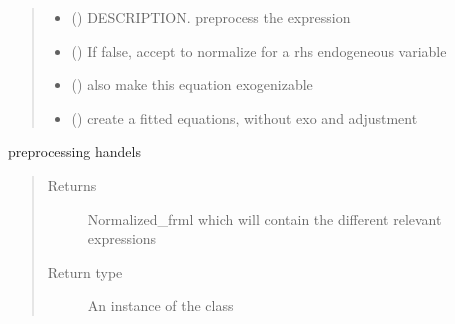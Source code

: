 \documentclass[letterpaper,10pt,english]{sphinxmanual}
\begin{document}
\begin{fulllineitems}
\begin{quote}
\begin{description}
\begin{itemize}
\item {} 
\sphinxAtStartPar
{} (\sphinxstyleliteralemphasis{\sphinxupquote{, }}) \textendash{} DESCRIPTION. preprocess the expression

\item {} 
\sphinxAtStartPar
{} (\sphinxstyleliteralemphasis{\sphinxupquote{, }}) \textendash{} If false, accept to normalize for a rhs endogeneous variable

\item {} 
\sphinxAtStartPar
{} (\sphinxstyleliteralemphasis{\sphinxupquote{, }}) \textendash{} also make this equation exogenizable

\item {} 
\sphinxAtStartPar
{} (\sphinxstyleliteralemphasis{\sphinxupquote{,}}) \textendash{} create a fitted equations, without exo and adjustment

\end{itemize}

\end{description}\end{quote}

\sphinxAtStartPar
preprocessing handels
\begin{quote}\begin{description}
\item[{Returns}] \leavevmode
\sphinxAtStartPar
Normalized\_frml which will contain the different relevant expressions

\item[{Return type}] \leavevmode
\sphinxAtStartPar
An instance of the class

\end{description}\end{quote}

\end{fulllineitems}

\end{document}
